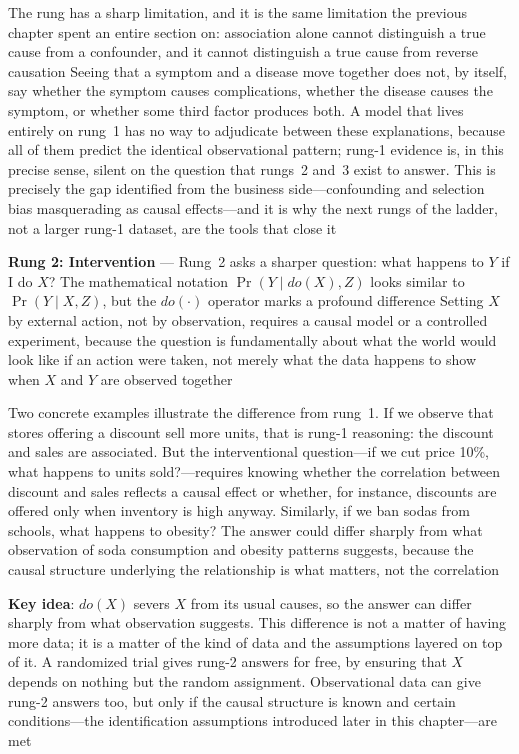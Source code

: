 The rung has a sharp limitation, and it is the same limitation the previous
chapter spent an entire section on: association alone cannot distinguish a true cause
from a confounder, and it cannot distinguish a true cause from reverse causation
Seeing that a symptom and a disease move together does not, by itself, say
whether the symptom causes complications, whether the disease causes the symptom,
or whether some third factor produces both. A model that lives entirely on rung~1
has no way to adjudicate between these explanations, because all of them predict
the identical observational pattern; rung-1 evidence is, in this precise sense, silent
on the question that rungs~2 and~3 exist to answer. This is precisely the gap
identified from the business side—confounding and selection bias masquerading as
causal effects—and it is why the next rungs of the ladder, not a larger rung-1 dataset,
are the tools that close it

\textbf{Rung 2: Intervention} --- Rung~2 asks a sharper question: what happens to
$Y$ if I do $X$? The mathematical notation $\Pr(Y \mid do(X), Z)$ looks similar
to $\Pr(Y \mid X, Z)$, but the $do(\cdot)$ operator marks a profound difference Setting
$X$ by external action, not by observation, requires a causal model or a controlled
experiment, because the question is fundamentally about what the world would
look like if an action were taken, not merely what the data happens to show when
$X$ and $Y$ are observed together

Two concrete examples illustrate the difference from rung~1. If we observe that
stores offering a discount sell more units, that is rung-1 reasoning: the
discount and sales are associated. But the interventional question—if we cut price
10\%, what happens to units sold?—requires knowing whether the correlation between
discount and sales reflects a causal effect or whether, for instance, discounts are
offered only when inventory is high anyway. Similarly, if we ban sodas from schools,
what happens to obesity? The answer could differ sharply from what observation of
soda consumption and obesity patterns suggests, because the causal structure
underlying the relationship is what matters, not the correlation

\textbf{Key idea}: $do(X)$ severs $X$ from its usual causes, so the answer can differ
sharply from what observation suggests. This difference is not a matter of
having more data; it is a matter of the kind of data and the assumptions layered
on top of it. A randomized trial gives rung-2 answers for free, by ensuring that
$X$ depends on nothing but the random assignment. Observational data can give
rung-2 answers too, but only if the causal structure is known and certain conditions—the
identification assumptions introduced later in this chapter—are met

